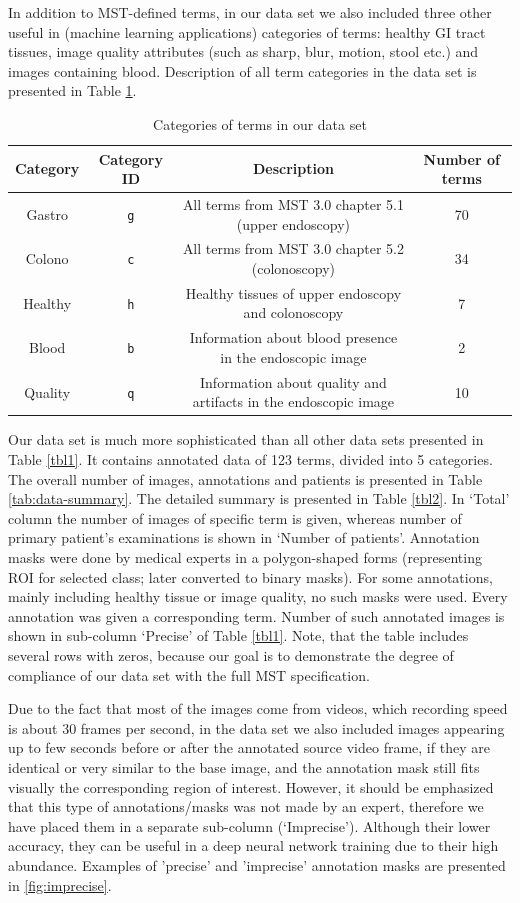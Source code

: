 \documentclass[preprint]{article}
\renewcommand{\onecolumn}{}
\renewcommand{\twocolumn}{}
\newcommand{\tabletextsize}{\tiny}
\begin{document}
In addition to MST-defined terms, in our data set we also included three other useful in (machine learning applications) categories of terms: healthy GI tract tissues, image quality attributes (such as sharp, blur, motion, stool etc.) and images containing blood. Description of all term categories in the data set is presented in Table \ref{tbl2a}.

\onecolumn

\tabletextsize
\begin{longtable}{c|c|c|c}
\caption{Categories of terms in our data set} \label{tbl2a} \\
Category & Category ID & Description & Number of terms \\ \hline
Gastro & \texttt{g} & All terms from MST 3.0 chapter 5.1 (upper endoscopy) & 70 \\
Colono & \texttt{c} & All terms from MST 3.0 chapter 5.2 (colonoscopy) & 34 \\
Healthy & \texttt{h} & Healthy tissues of upper endoscopy and colonoscopy & 7 \\
Blood & \texttt{b} & Information about blood presence in the endoscopic image & 2 \\
Quality & \texttt{q} & Information about quality and artifacts in the endoscopic image & 10 
\end{longtable}
\normalsize

\twocolumn


Our data set is much more sophisticated than all other data sets presented in Table \ref{tbl1}. It contains annotated data of 123 terms, divided into 5 categories. The overall number of images, annotations and patients is presented in Table \ref{tab:data-summary}. The detailed summary is presented in Table \ref{tbl2}. In `Total' column the number of images of specific term is given, whereas number of primary patient's examinations is shown in `Number of patients'. Annotation masks were done by medical experts in a polygon-shaped forms (representing ROI for selected class; later converted to binary masks). For some annotations, mainly including healthy tissue or image quality, no such masks were used. Every annotation was given a corresponding term. Number of such annotated images is shown in sub-column `Precise' of Table \ref{tbl1}. Note, that the table includes several rows with zeros, because our goal is to demonstrate the degree of compliance of our data set with the full MST specification.

Due to the fact that most of the images come from videos, which recording speed is about 30 frames per second, in the data set we also included images appearing up to few seconds before or after the annotated source video frame, if they are identical or very similar to the base image, and the annotation mask still fits visually the corresponding region of interest. However, it should be emphasized that this type of annotations/masks was not made by an expert, therefore we have placed them in a separate sub-column (`Imprecise'). Although their lower accuracy, they can be useful in a deep neural network training due to their high abundance. Examples of 'precise' and 'imprecise' annotation masks are presented in \cref{fig:imprecise}. \label{sec:imprecise}
\end{document}
